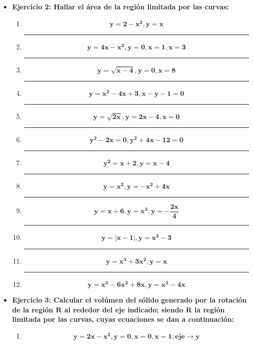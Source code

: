 \documentclass[12pt]{article}
\begin{document}
\begin{itemize}
        \item \textbf{Ejercicio 2: Hallar el área de la región limitada por las curvas:}\vspace{0.5cm}
            \begin{enumerate}
                \hrule
                \item \[\bm{y = 2 - x^2, y = x}\]
            
                \hrule
                \item \[\bm{y = 4x - x^2, y = 0, x = 1, x = 3}\]
            
                \hrule
                \item \[\bm{y = \sqrt{x - 4}, y = 0, x = 8}\]
            
                \hrule
                \item \[\bm{y = x^2 - 4x + 3, x - y - 1 = 0}\]
            
                \hrule
                \item \[\bm{y = \sqrt{2x}, y = 2x - 4, x = 0}\]

                \hrule
                \item \[\bm{y^2 - 2x = 0, y^2 + 4x - 12 = 0}\]

                \hrule
                \item \[\bm{y^2 = x + 2, y = x - 4}\]

                \hrule
                \item \[\bm{y = x^2, y = - x^2 + 4x}\]

                \hrule
                \item \[\bm{y = x + 6, y = x^3, y = - \frac{2x}{4}}\]
                
                \hrule
                \item \[\bm{y = \left|x - 1\right|, y = x^2 - 3}\]
                
                \hrule
                \item \[\bm{y = x^3 + 3x^2, y = x}\]
                
                \hrule
                \item \[\bm{y = x^3 - 6x^2 + 8x, y = x^2 - 4x}\]

            \end{enumerate}
        
        \item \textbf{Ejercicio 3: Calcular el volúmen del sólido generado por la rotación de la región $\bm{R}$ al rededor del eje indicado; siendo $\bm{R}$ la región limitada por las curvas, cuyas ecuaciones se dan a continuación:} \vspace{0.5cm}
            \begin{enumerate}[label=\alph*.]
                \hrule
                \item \[\bm{y = 2x - x^2, y = 0, x = 0, x = 1; eje \rightarrow y}\]
                

\end{enumerate}
\end{itemize}
\end{document}
